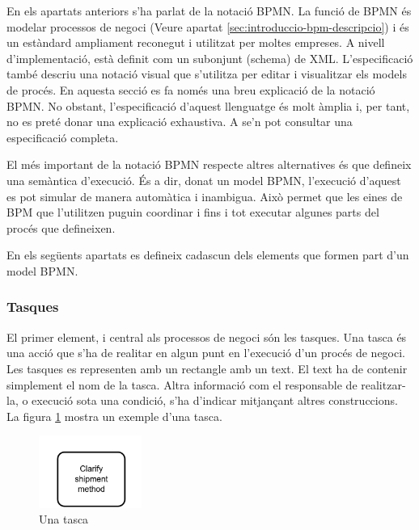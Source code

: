En els apartats anteriors s'ha parlat de la notació BPMN. La funció de BPMN és modelar processos de negoci (Veure apartat \ref{sec:introduccio-bpm-descripcio}) i és un estàndard ampliament reconegut i utilitzat per moltes empreses. A nivell d'implementació, està definit com un subonjunt (schema) de XML. L'especificació també descriu una notació visual que s'utilitza per editar i visualitzar els models de procés. En aquesta secció es fa només una breu explicació de la notació BPMN. No obstant, l'especificació d'aquest llenguatge és molt àmplia i, per tant, no es preté donar una explicació exhaustiva. A \cite{bpmn_spec} se'n pot consultar una especificació completa.

El més important de la notació BPMN respecte altres alternatives és que defineix una semàntica d'execució. És a dir, donat un model BPMN, l'execució d'aquest es pot simular de manera automàtica i inambigua. Això permet que les eines de BPM que l'utilitzen puguin coordinar i fins i tot executar algunes parts del procés que defineixen.

En els següents apartats es defineix cadascun dels elements que formen part d'un model BPMN.

\subsubsection{Tasques}

El primer element, i central als processos de negoci són les tasques. Una tasca és una acció que s'ha de realitar en algun punt en l'execució d'un procés de negoci. Les tasques es representen amb un rectangle amb un text. El text ha de contenir simplement el nom de la tasca. Altra informació com el responsable de realitzar-la, o execució sota una condició, s'ha d'indicar mitjançant altres construccions. La figura \ref{fig:task-example} mostra un exemple d'una tasca. 

\begin{figure}[!hbt]
    \centering
    \includegraphics[width=0.3\textwidth]{figures/bpmn-task.png}
    \caption{Una tasca}
    \label{fig:task-example}
\end{figure}

